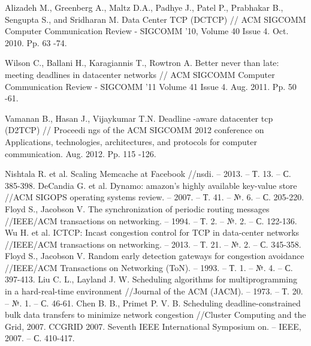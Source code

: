\documentclass[14pt, a4paper,oneside]{extarticle}
\begin{document}
\begin{thebibliography}{9}

Alizadeh M., Greenberg A., Maltz
 D.A., Padhye J., Patel P., Prabhakar B., 
Sengupta S., and Sridharan M. Data Center TCP (DCTCP) // ACM SIGCOMM 
Computer Communication Review -
 SIGCOMM '10, Volume 40 Issue 4. Oct. 
2010. Pp. 63
-74.

Wilson C., Ballani H., Karagiannis T., Rowtron
 A. Better never than late: meeting 
deadlines in datacenter networks // ACM SIGCOMM Computer Communication 
Review 
- SIGCOMM '11 Volume 41 Issue 4. Aug. 2011. Pp. 50
-61. 

Vamanan B., Hasan J., Vijaykumar T.N. Deadline
-aware datacenter tcp (D2TCP) 
// Proceedi
ngs of the ACM SIGCOMM 2012 conference on Applications, 
technologies, architectures, and protocols for computer communication. Aug. 
2012. Pp. 115
-126. 

Nishtala R. et al. Scaling Memcache at Facebook //nsdi. – 2013. – Т. 13. – С. 385-398.
DeCandia G. et al. Dynamo: amazon's highly available key-value store //ACM SIGOPS operating systems review. – 2007. – Т. 41. – №. 6. – С. 205-220.
Floyd S., Jacobson V. The synchronization of periodic routing messages //IEEE/ACM transactions on networking. – 1994. – Т. 2. – №. 2. – С. 122-136.
Wu H. et al. ICTCP: Incast congestion control for TCP in data-center networks //IEEE/ACM transactions on networking. – 2013. – Т. 21. – №. 2. – С. 345-358.
Floyd S., Jacobson V. Random early detection gateways for congestion avoidance //IEEE/ACM Transactions on Networking (ToN). – 1993. – Т. 1. – №. 4. – С. 397-413.
Liu C. L., Layland J. W. Scheduling algorithms for multiprogramming in a hard-real-time environment //Journal of the ACM (JACM). – 1973. – Т. 20. – №. 1. – С. 46-61.
Chen B. B., Primet P. V. B. Scheduling deadline-constrained bulk data transfers to minimize network congestion //Cluster Computing and the Grid, 2007. CCGRID 2007. Seventh IEEE International Symposium on. – IEEE, 2007. – С. 410-417.

\end{thebibliography}
\end{document}

